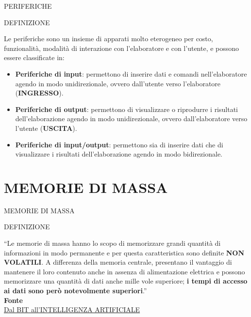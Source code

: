 \documentclass[aspectratio=1610]{beamer}
\begin{document}
\begin{frame}{PERIFERICHE}
    \begin{alertblock}{DEFINIZIONE}
        \begin{minipage}{0.98\linewidth}
            \justifying
            Le periferiche sono un insieme di apparati molto eterogeneo per costo, funzionalità, modalità 
            di interazione con l'elaboratore e con l'utente, e possono essere classificate in:
            \bigskip
            \begin{itemize}
                \justifying
                \pause
                \item \textbf{Periferiche di input}: permettono di inserire dati e comandi nell'elaboratore agendo in 
                modo unidirezionale, ovvero dall'utente verso l'elaboratore (\textbf{INGRESSO}).
                \pause
                \item \textbf{Periferiche di output}: permettono di visualizzare o riprodurre i risultati dell'elaborazione 
                agendo in modo unidirezionale, ovvero dall'elaboratore verso l'utente (\textbf{USCITA}).
                \pause
                \item \textbf{Periferiche di input/output}: permettono sia di inserire dati che di visualizzare 
                i risultati dell'elaborazione agendo in modo bidirezionale.
            \end{itemize}
            \bigskip
        \end{minipage}
    \end{alertblock}
\end{frame}

\section{MEMORIE DI MASSA}

\begin{frame}{MEMORIE DI MASSA}
    \begin{alertblock}{DEFINIZIONE}
        \begin{minipage}{0.98\linewidth}
            \justifying
            ``Le memorie di massa hanno lo scopo di memorizzare grandi quantità di informazioni in modo 
            permanente e per questa caratteristica sono definite \textbf{NON VOLATILI}. A differenza della 
            memoria centrale, presentano il vantaggio di mantenere il loro contenuto anche in assenza di 
            alimentazione elettrica e possono memorizzare una quantità di dati anche mille vole superiore; 
            \textbf{i tempi di accesso ai dati sono però notevolmente superiori}.''\\
            \bigskip
            \tiny{\textbf{Fonte}}\\
            \tiny{\href{https://catalogo.sanoma.it/si-op-104157-dal-bit-all-intelligenza-artificiale.html}{Dal BIT all'INTELLIGENZA ARTIFICIALE}}
        \end{minipage}
    \end{alertblock}
\end{frame}
\end{document}
